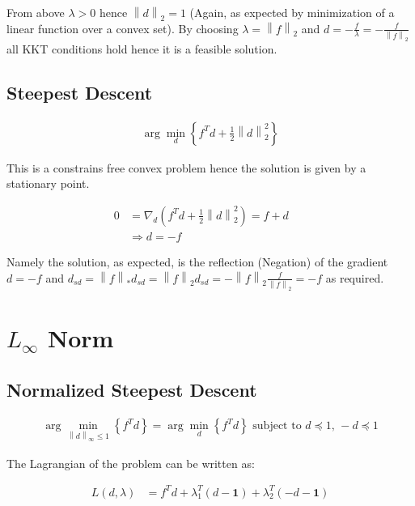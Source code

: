 \documentclass[]{article}
\newcommand{\MyParen}[1]{\left( #1 \right)}
\newcommand{\MyBrace}[1]{\left\lbrace #1 \right\rbrace}
\newcommand{\MyNorm}[2]{{\left\| #1 \right\|}_{#2}}
\newcommand{\MyNormSqr}[2]{{\left\| #1 \right\|}_{#2}^{2}}
\newcommand{\MyNormTwo}[1]{\MyNorm{#1}{2}}
\begin{document}
	From above $ \lambda > 0 $ hence $ \MyNormTwo{d} = 1 $ (Again, as expected by minimization of a linear function over a convex set). By choosing $ \lambda = \MyNormTwo{f} $ and $ d = -\frac{f}{\lambda} = - \frac{f}{\MyNormTwo{f}} $ all KKT conditions hold hence it is a feasible solution.
	
	\subsection{Steepest Descent}
	
	\begin{align*}
	\arg \min_{ d } \MyBrace{ {f}^{T} d + \frac{1}{2} \MyNormSqr{d}{2} }
	\end{align*}
	
	This is a constrains free convex problem hence the solution is given by a stationary point.
	
	\begin{align*}
	0 & = {\nabla}_{d} \MyParen{ {f}^{T} d + \frac{1}{2} \MyNormSqr{d}{2} } = f + d && \text{} \\
	& \Rightarrow d = -f
	\end{align*}
	
	Namely the solution, as expected, is the reflection (Negation) of the gradient $ d = -f $ and $ {d}_{sd} = \MyNorm{f}{\ast} {d}_{sd} = \MyNorm{f}{2} {d}_{sd} = -\MyNorm{f}{2} \frac{f}{ \MyNormTwo{f} } = -f $ as required.
	
	\section{$ {L}_{\infty} $ Norm}
	
	\subsection{Normalized Steepest Descent}
	
	\begin{align*}
	\arg \min_{ \MyNorm{d}{\infty} \leq 1 } \MyBrace{ {f}^{T} d } = \arg \min_{d} \MyBrace{ {f}^{T} d } \text{ subject to } d \preceq 1, \, -d \preceq 1
	\end{align*}
	
	The Lagrangian of the problem can be written as:
	
	\begin{align*}
	L \MyParen{d, \lambda} & = {f}^{T} d + {\lambda}_{1}^{T} \MyParen{ d - \boldsymbol{1} } + {\lambda}_{2}^{T} \MyParen{ -d - \boldsymbol{1} }
	\end{align*}
	
\end{document}
